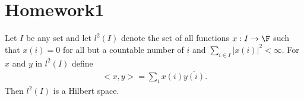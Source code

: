 \chapter{Homework1}\label{chp:homework1}



\begin{proposition}{}{}
    Let $I$ be any set and let $l^2(I)$ denote the set of all functions $x:I\rightarrow \F$ such that $x(i)=0$ for all but a countable number of $i$ and 
    $\sum_{i\in I}|x(i)|^2<\infty$. For $x$ and $y$ in $l^2(I)$ define
    \begin{align*}
        <x,y> = \sum\limits_{i}x(i)\overline{y(i)}.
    \end{align*}
    Then $l^2(I)$ is a Hilbert space.
\end{proposition}

\begin{proofsolution}
    \begin{align*}
        
    \end{align*}
\end{proofsolution}